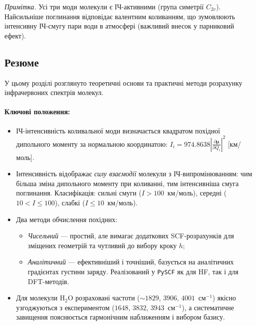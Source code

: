 \smallskip
\textit{Примітка.} Усі три моди молекули  є ІЧ-активними
(група симетрії $C_{2v}$). Найсильніше поглинання відповідає
валентним коливанням, що зумовлюють інтенсивну ІЧ-смугу пари води
в атмосфері (важливий внесок у парниковий ефект).

\subsection*{Резюме}

У цьому розділі розглянуто теоретичні основи та практичні методи розрахунку
інфрачервоних спектрів молекул.

\paragraph{Ключові положення:}
\begin{itemize}
    \item ІЧ-інтенсивність коливальної моди визначається квадратом похідної
          дипольного моменту за нормальною координатою:
          $I_i = 974.8638 \left|\frac{\partial\boldsymbol{\mu}}{\partial Q_i}\right|^2$ [км/моль].

    \item Інтенсивність відображає \emph{силу взаємодії} молекули з ІЧ-випромінюванням:
          чим більша зміна дипольного моменту при коливанні, тим інтенсивніша смуга поглинання.
          Класифікація: сильні смуги ($I > 100$~км/моль), середні ($10 < I \leq 100$),
          слабкі ($I \leq 10$~км/моль).

    \item Два методи обчислення похідних:
          \begin{itemize}
              \item \textit{Чисельний} --- простий, але вимагає додаткових SCF-розрахунків
                    для зміщених геометрій та чутливий до вибору кроку $h$;
              \item \textit{Аналітичний} --- ефективніший і точніший, базується на аналітичних
                    градієнтах густини заряду. Реалізований у \texttt{PySCF} як для HF,
                    так і для DFT-методів.
          \end{itemize}

    \item Для молекули H$_2$O розраховані частоти ($\sim 1829$, $3906$, $4001$~см$^{-1}$)
          якісно узгоджуються з експериментом ($1648$, $3832$, $3943$~см$^{-1}$),
          а систематичне завищення пояснюється гармонічним наближенням і вибором базису.


\end{itemize}
